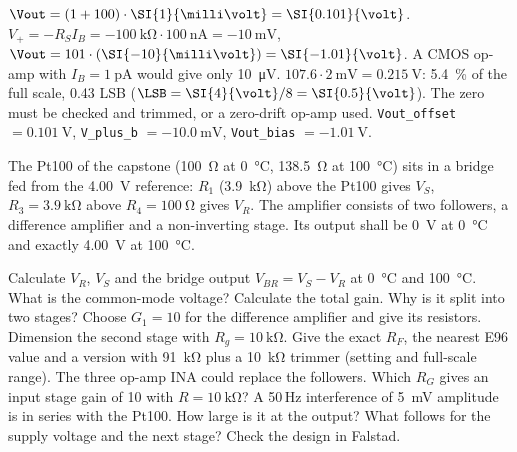 \begin{solution}
\begin{talist}
\ta $\Vout = (1 + 100)\cdot\SI{1}{\milli\volt} = \SI{0.101}{\volt}$.
\ta $V_+ = -R_S I_B = -\SI{100}{\kilo\ohm}\cdot\SI{100}{\nano\ampere} = \SI{-10}{\milli\volt}$, $\Vout = 101\cdot(\SI{-10}{\milli\volt}) = \SI{-1.01}{\volt}$.
    A CMOS op-amp with $I_B=\SI{1}{\pico\ampere}$ would give only \SI{10}{\micro\volt}.
\ta $107.6\cdot\SI{2}{\milli\volt} = \SI{0.215}{\volt}$: \SI{5.4}{\percent} of the full scale, 0.43 LSB
    ($\LSB = \SI{4}{\volt}/8 = \SI{0.5}{\volt}$). The zero must be checked and trimmed, or a zero-drift op-amp used.
\ta {}\newline \texttt{Vout\_offset} $=\SI{0.101}{\volt}$, \texttt{V\_plus\_b} $=\SI{-10.0}{\milli\volt}$, \texttt{Vout\_bias} $=\SI{-1.01}{\volt}$.
\end{talist}
\end{solution}

\label{ex:opamp-ina}
The Pt100 of the capstone (\SI{100}{\ohm} at \SI{0}{\celsius}, \SI{138.5}{\ohm} at \SI{100}{\celsius})
sits in a bridge fed from the \SI{4.00}{\volt} reference: $R_1$ (\SI{3.9}{\kilo\ohm}) above the
Pt100 gives $V_S$, $R_3 = \SI{3.9}{\kilo\ohm}$ above $R_4 = \SI{100}{\ohm}$ gives $V_R$.
The amplifier consists of two followers, a difference amplifier and a non-inverting stage.
Its output shall be \SI{0}{\volt} at \SI{0}{\celsius} and exactly \SI{4.00}{\volt} at \SI{100}{\celsius}.
\begin{talist}
\ta Calculate $V_R$, $V_S$ and the bridge output $V_{BR} = V_S - V_R$ at \SI{0}{\celsius} and \SI{100}{\celsius}. What is the common-mode voltage?
\ta Calculate the total gain. Why is it split into two stages?
\ta Choose $G_1 = 10$ for the difference amplifier and give its resistors.
\ta Dimension the second stage with $R_g = \SI{10}{\kilo\ohm}$. Give the exact $R_F$, the nearest E96 value and a version with \SI{91}{\kilo\ohm} plus a \SI{10}{\kilo\ohm} trimmer (setting and full-scale range).
\ta The three op-amp INA could replace the followers. Which $R_G$ gives an input stage gain of 10 with $R = \SI{10}{\kilo\ohm}$?
\ta A 50\,Hz interference of \SI{5}{\milli\volt} amplitude is in series with the Pt100. How large is it at the output? What follows for the supply voltage and the next stage?
\ta Check the design in Falstad.
\end{talist}

